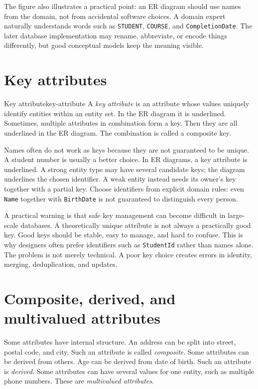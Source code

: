 \documentclass[11pt,a4paper,openany]{book}
\begin{document}
The figure also illustrates a practical point: an ER diagram should use names from the domain, not from accidental software choices. A domain expert naturally understands words such as \texttt{STUDENT}, \texttt{COURSE}, and \texttt{CompletionDate}. The later database implementation may rename, abbreviate, or encode things differently, but good conceptual models keep the meaning visible.

\section{Key attributes}
\begin{definition}{Key attribute}{key-attribute}
A \emph{key attribute} is an attribute whose values uniquely identify entities within an entity set. In the ER diagram it is underlined. Sometimes, multiple attributes in combination form a key. Then they are all underlined in the ER diagram. The combination is called a composite key.
\end{definition}

Names often do not work as keys because they are not guaranteed to be unique. A student number is usually a better choice. In ER diagrams, a key attribute is underlined. A strong entity type may have several candidate keys; the diagram underlines the chosen identifier. A weak entity instead needs its owner's key together with a partial key. Choose identifiers from explicit domain rules: even \texttt{Name} together with \texttt{BirthDate} is not guaranteed to distinguish every person.

A practical warning is that safe key management can become difficult in large-scale databases. A theoretically unique attribute is not always a practically good key. Good keys should be stable, easy to manage, and hard to confuse. This is why designers often prefer identifiers such as \texttt{StudentId} rather than names alone. The problem is not merely technical. A poor key choice creates errors in identity, merging, deduplication, and updates.

\section{Composite, derived, and multivalued attributes}
Some attributes have internal structure. An address can be split into street, postal code, and city. Such an attribute is called \emph{composite}. Some attributes can be derived from others. Age can be derived from date of birth. Such an attribute is \emph{derived}. Some attributes can have several values for one entity, such as multiple phone numbers. These are \emph{multivalued attributes}.
\end{document}
